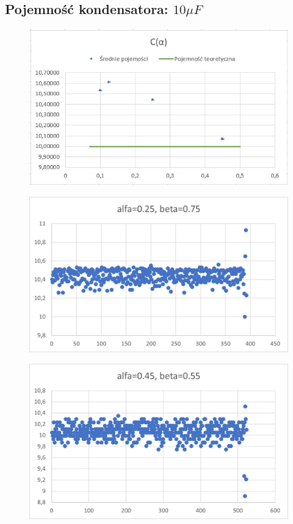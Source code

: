 \documentclass[12pt]{mwart}
\begin{document}
	\subsection{Pojemność kondensatora: $10 \mu F$}
	\begin{figure}[H]
		\centering
		\includegraphics{data/10_sr.jpg}
	\end{figure}
	\begin{figure}[H]
		\centering
		\includegraphics{data/10_a0.25.png}
	\end{figure}
	\begin{figure}[H]
		\centering
		\includegraphics{data/10_a0.45.png}
	\end{figure}
\end{document}
